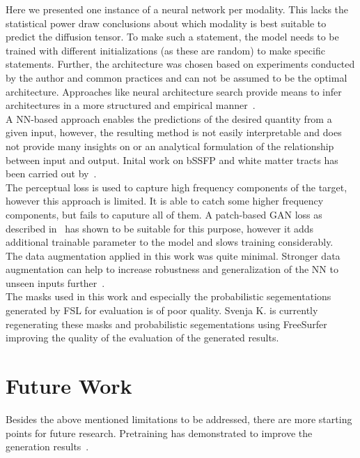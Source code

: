 Here we presented one instance of a neural network per modality.
This lacks the statistical power draw conclusions about which modality is best suitable to predict the diffusion tensor.
To make such a statement, the model needs to be trained with different initializations (as these are random) to make specific statements.
Further, the architecture was chosen based on experiments conducted by the author and common practices and can not be assumed to be the optimal architecture.
Approaches like neural architecture search provide means to infer architectures in a more structured and empirical manner~\autocite{white_neural_2023}. \\

A NN-based approach enables the predictions of the desired quantity from a given input, however, the resulting method is not easily interpretable and does not provide many insights on or an analytical formulation of the relationship between input and output.
Inital work on bSSFP and white matter tracts has been carried out by~\autocite{miller_asymmetries_2010ii, miller_asymmetries_2010i}. \\

The perceptual loss is used to capture high frequency components of the target, however this approach is limited.
It is able to catch some higher frequency components, but fails to caputure all of them.
A patch-based GAN loss as described in~\autocite{isola_image-image_2017} has shown to be suitable for this purpose, however it adds additional trainable parameter to the model and slows training considerably. \\

The data augmentation applied in this work was quite minimal.
Stronger data augmentation can help to increase robustness and generalization of the NN to unseen inputs further~\autocite{goodfellow_deep_2016}. \\

The masks used in this work and especially the probabilistic segementations generated by FSL for evaluation is of poor quality.
Svenja K. is currently regenerating these masks and probabilistic segementations using FreeSurfer improving the quality of the evaluation of the generated results.\\

\section{Future Work}
Besides the above mentioned limitations to be addressed, there are more starting points for future research.
Pretraining has demonstrated to improve the generation results~\autocite{wang_pretraining_2022}. \\

